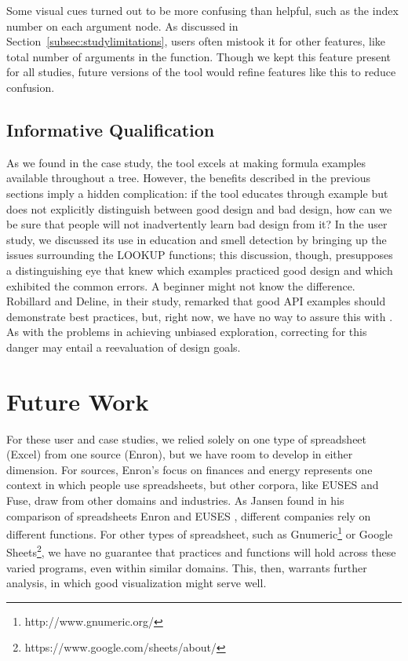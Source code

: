 \documentclass[conference]{IEEEtran}
\begin{document}
	Some visual cues turned out to be more confusing than helpful, such as
	the index number on each argument node. As discussed in Section~\ref{subsec:studylimitations},
	users often mistook it for other features, like total number of arguments in the
	function. Though we kept this feature present for all studies, future versions
	of the tool would refine features like this to reduce confusion. 
	
	\subsection{Informative Qualification}
	
	As we found in the case study, the tool excels at making formula examples
	available throughout a tree. However, the benefits described in the previous
	sections imply a hidden complication: if the tool educates through example but
	does not explicitly distinguish between good design and bad design, how can we
	be sure that people will not inadvertently learn bad design from it? In the
	user study, we discussed its use in education and smell detection by bringing
	up the issues surrounding the LOOKUP functions; this discussion, though,
	presupposes a distinguishing eye that knew which examples practiced good design
	and which exhibited the common errors. A beginner might not know the
	difference. Robillard and Deline, in their study, remarked that good API
	examples should demonstrate best practices, but, right now, we have no way to
	assure this with \toolnameend. As with the problems in achieving unbiased
	exploration, correcting for this danger may entail a reevaluation of design
	goals.
	
	\section{Future Work}
	
	For these user and case studies, we relied solely on one type of spreadsheet (Excel)
	from one source (Enron), but we have room to develop in either dimension. For sources, 
	Enron's focus on finances and energy represents one context in
	which people use spreadsheets, but other corpora, like EUSES and Fuse, draw from
	other domains and industries. As Jansen found in his comparison of
	spreadsheets Enron and EUSES \cite{jansen2015enron}, different companies rely
	on different functions. For other types of spreadsheet, such as Gnumeric\footnote{http://www.gnumeric.org/} or Google
	Sheets\footnote{https://www.google.com/sheets/about/}, we have no
	guarantee that practices and functions will hold across these varied programs, even within
	similar domains. This, then, warrants further analysis, in which good visualization might serve
	well. \par	
	
\end{document}

